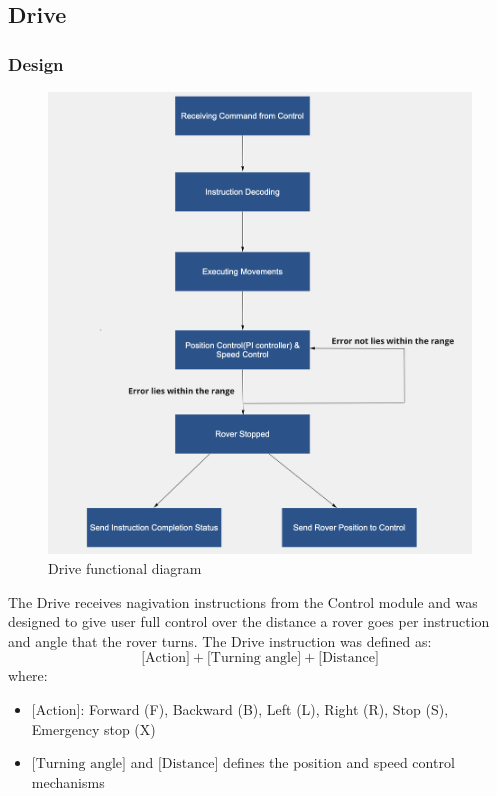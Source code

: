 \documentclass[11pt, a4paper]{article}
\begin{document}
\subsection{Drive}
\subsubsection{Design}

\begin{figure} [h!]
    \centering
    \includegraphics[scale=0.3]{Drive_functional.png}
    \caption{Drive functional diagram}
\end{figure}

The Drive receives nagivation instructions from the Control module and was designed to give user full control over the distance a rover goes per instruction and angle that the rover turns. The Drive instruction was defined as:
$$
\text{[Action]} + \text{[Turning angle]} + \text{[Distance]}
$$
where:
\begin{itemize}
    \item $\text{[Action]}$: Forward (F), Backward (B), Left (L), Right (R), Stop (S), Emergency stop (X)
    \item $\text{[Turning angle]}$ and $\text{[Distance]}$ defines the position and speed control mechanisms
\end{itemize}
\end{document}
